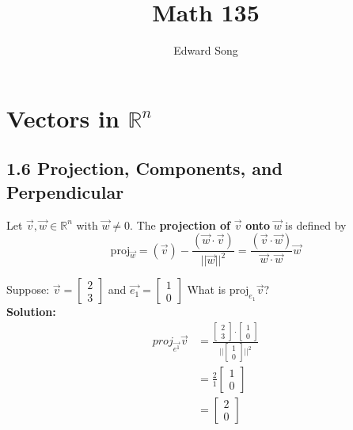 \documentclass[11pt]{article}
\title{Math 135}
\author{Edward Song}
\theoremstyle{plain}
\theoremstyle{remark}
\theoremstyle{plain}
\newcommand{\bd}{\textbf}
\newcommand{\rn}{\mathbb{R}}
\begin{document}
\section{Vectors in $\rn^n$}


   


\subsection*{1.6 Projection, Components, and Perpendicular}
\begin{tcolorbox}[colback=green!5!white,colframe=green!75!black,title=Definition]
    Let $\overrightarrow{v}, \overrightarrow{w}\in\rn^n$ with $\overrightarrow{w}\neq 0$. The \bd{projection of} $\overrightarrow{v}$ \bd{onto} 
    $\overrightarrow{w}$ is defined by
    \[\text{proj}_{\overrightarrow{w}} = (\overrightarrow{v}) - \frac{(\overrightarrow{w}\cdot \overrightarrow{v})}{||\overrightarrow{w}||^2} = \frac{(\overrightarrow{v}\cdot \overrightarrow{w})}{\overrightarrow{w}\cdot\overrightarrow{w}}\overrightarrow{w}\] 
\end{tcolorbox}   

\begin{tcolorbox}[colback=magenta!5!white,colframe=magenta!75!black,title=Example]
    Suppose: $\overrightarrow{v} = \begin{bmatrix}
        2 \\3
    \end{bmatrix}$ and $\overrightarrow{e_1} = \begin{bmatrix}
        1\\0
    \end{bmatrix}$ What is $\text{proj}_{e_1}\overrightarrow{v}$?\\

    \bd{Solution:}
    \begin{align*}
        proj_{\overrightarrow{e^1}}\overrightarrow{v} &=\frac{\begin{bmatrix}
            2\\3
        \end{bmatrix}\cdot\begin{bmatrix}
            1\\0
        \end{bmatrix}}{||\begin{bmatrix}
            1\\0
        \end{bmatrix}||^2} \\
        &= \frac{2}{1}\begin{bmatrix}
            1\\0
        \end{bmatrix} \\
        &= \begin{bmatrix}
            2\\0
        \end{bmatrix}
    \end{align*}
\end{tcolorbox}   
\end{document}
